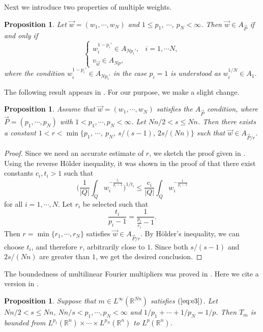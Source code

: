 \documentclass[11pt,oneside,onecolumn]{amsart}
\numberwithin{equation}{section}
\newtheorem{Proposition}[Theorem]{Proposition}
\begin{document}
Next we introduce two properties of   multiple weights.
\begin{Proposition}\cite[Theorem 3.6]{LOPTG}
Let $\vec{w}=(w_1,\cdots,w_N)$ and $1\le p_1$, $\cdots$, $p_N<\infty$. Then $\vec{w}\in A_{\vec{P}}$ if and only if
\begin{equation}
\begin{cases}
w_i^{1-p_i'}\in A_{Np_i'}, & i=1,\cdots N, \\
v_{\vec{w}}\in A_{Np},
\end{cases}
\end{equation}
where the condition $w_i^{1-p_i'}\in A_{Np_i'}$ in the case $p_i=1$ is understood as $w_i^{1/N}\in A_1$.
\end{Proposition}

The following result appears in \cite[Lemma 6.1]{LOPTG}. For our purpose,
we make a slight change.
\begin{Proposition}\label{prop:loptg}
Assume that $\vec{w}=(w_1,\cdots,w_N)$ satisfies the $A_{\vec{P}}$ condition, where $\vec{P}=(p_1,\cdots, p_N)$ with
$1<p_1,\cdots, p_N<\infty$. Let
$Nn/2<s\le Nn$. Then there exists a  constant
$1<r<\min\{p_1$, $\cdots$, $p_N$, $s/(s-1)$, $2s/(Nn)\}$ such that $\vec{w}\in A_{\vec{P}/r}$.
\end{Proposition}

\begin{proof}
Since we need an accurate estimate of $r$, we sketch the proof given in  \cite{LOPTG}.
Using the reverse H\"{o}lder inequality, it was shown in  the proof of  \cite[Lemma 6.1]{LOPTG} that there exist constants $c_i, t_i>1$ such that
\[
   \bigg(\frac{1}{|Q|}\int_Q w_i^{-\frac{t_i}{p_i-1}}\bigg)^{1/{t_i}}\le
   \frac{c_i}{|Q|}\int_Q w_i^{-\frac{1}{p_i-1}}
\]
for all $i=1,\cdots, N$.
Let $r_i$ be selected such that
\[
  \frac{t_i}{p_i-1}=\frac{1}{\frac{p_i}{r_i}-1}.
\]
Then $r=\min\{r_1,\cdots, r_N\}$ satisfies $\vec{w}\in A_{\vec{P}/r}$.
By H\"{o}lder's inequality, we can choose $t_i$, and therefore $r$, arbitrarily close to $1$. Since both $s/(s-1)$ and $2s/(Nn)$ are greater than $1$,
we get the desired conclusion.
\end{proof}

The boundedness of multilinear Fourier multipliers
was proved in \cite{CM,GS,GT,T}. Here we cite a version in \cite{GS}.

\begin{Proposition}\cite[Theorem 1.1]{GS}\label{prop:gs}
Suppose that $m\in L^\infty({\mathbb{R}}^{Nn})$ satisfies $(\ref{eq:e3})$.
Let $Nn/2<s\le Nn$, $Nn/s< p_1, \cdots, p_N<\infty$ and $1/{p_1}+\cdots+1/{p_N}=1/p$.  Then
$T_m$ is bounded from $L^{p_1}({\mathbb{R}}^n)\times \cdots \times L^{p_N}({\mathbb{R}}^n)$ to $L^p({\mathbb{R}}^n)$.
\end{Proposition}
\end{document}
